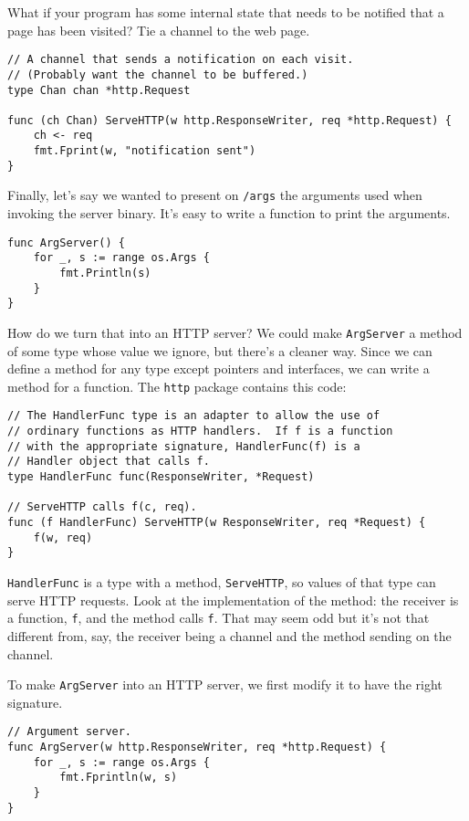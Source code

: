 What if your program has some internal state that needs to be notified
that a page has been visited? Tie a channel to the web page.

\begin{Verbatim}[frame=single]
// A channel that sends a notification on each visit.
// (Probably want the channel to be buffered.)
type Chan chan *http.Request

func (ch Chan) ServeHTTP(w http.ResponseWriter, req *http.Request) {
    ch <- req
    fmt.Fprint(w, "notification sent")
}
\end{Verbatim}

Finally, let's say we wanted to present on \texttt{/args} the arguments
used when invoking the server binary. It's easy to write a function to
print the arguments.

\begin{Verbatim}[frame=single]
func ArgServer() {
    for _, s := range os.Args {
        fmt.Println(s)
    }
}
\end{Verbatim}

How do we turn that into an HTTP server? We could make
\texttt{ArgServer} a method of some type whose value we ignore, but
there's a cleaner way. Since we can define a method for any type except
pointers and interfaces, we can write a method for a function. The
\texttt{http} package contains this code:

\begin{Verbatim}[frame=single]
// The HandlerFunc type is an adapter to allow the use of
// ordinary functions as HTTP handlers.  If f is a function
// with the appropriate signature, HandlerFunc(f) is a
// Handler object that calls f.
type HandlerFunc func(ResponseWriter, *Request)

// ServeHTTP calls f(c, req).
func (f HandlerFunc) ServeHTTP(w ResponseWriter, req *Request) {
    f(w, req)
}
\end{Verbatim}

\texttt{HandlerFunc} is a type with a method, \texttt{ServeHTTP}, so
values of that type can serve HTTP requests. Look at the implementation
of the method: the receiver is a function, \texttt{f}, and the method
calls \texttt{f}. That may seem odd but it's not that different from,
say, the receiver being a channel and the method sending on the channel.

To make \texttt{ArgServer} into an HTTP server, we first modify it to
have the right signature.

\begin{Verbatim}[frame=single]
// Argument server.
func ArgServer(w http.ResponseWriter, req *http.Request) {
    for _, s := range os.Args {
        fmt.Fprintln(w, s)
    }
}
\end{Verbatim}

